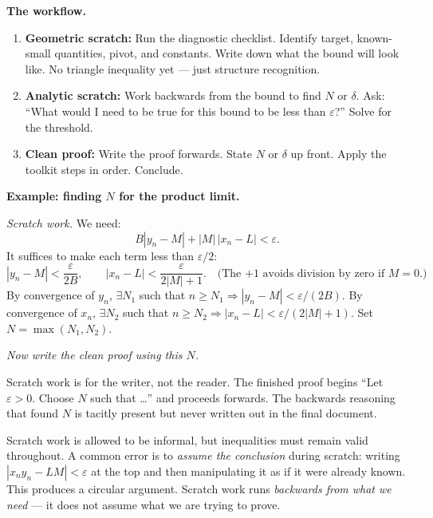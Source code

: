 \noindent\textbf{The workflow.}
\begin{enumerate}
  \item \textbf{Geometric scratch:} Run the diagnostic checklist.
        Identify target, known-small quantities, pivot, and constants.
        Write down what the bound will look like.
        No triangle inequality yet — just structure recognition.
  \item \textbf{Analytic scratch:} Work backwards from the bound
        to find $N$ or $\delta$.
        Ask: ``What would I need to be true for this bound to be
        less than $\varepsilon$?'' Solve for the threshold.
  \item \textbf{Clean proof:} Write the proof forwards.
        State $N$ or $\delta$ up front.
        Apply the toolkit steps in order.
        Conclude.
\end{enumerate}

\medskip

\noindent\textbf{Example: finding $N$ for the product limit.}

\textit{Scratch work.} We need:
\[
  B|y_n - M| + |M|\,|x_n - L| < \varepsilon.
\]
It suffices to make each term less than $\varepsilon/2$:
\[
  |y_n - M| < \frac{\varepsilon}{2B}, \qquad
  |x_n - L| < \frac{\varepsilon}{2|M|+1}.
  \quad\text{(The $+1$ avoids division by zero if $M=0$.)}
\]
By convergence of $y_n$, $\exists N_1$ such that $n \ge N_1
\Rightarrow |y_n - M| < \varepsilon/(2B)$.
By convergence of $x_n$, $\exists N_2$ such that $n \ge N_2
\Rightarrow |x_n - L| < \varepsilon/(2|M|+1)$.
Set $N = \max(N_1, N_2)$.

\textit{Now write the clean proof using this $N$.}

\begin{remark*}
Scratch work is for the writer, not the reader.
The finished proof begins ``Let $\varepsilon > 0$.
Choose $N$ such that \ldots'' and proceeds forwards.
The backwards reasoning that found $N$ is tacitly present
but never written out in the final document.
\end{remark*}

\begin{remark*}
Scratch work is allowed to be informal, but inequalities must
remain valid throughout.
A common error is to \emph{assume the conclusion} during scratch:
writing $|x_n y_n - LM| < \varepsilon$ at the top and then
manipulating it as if it were already known.
This produces a circular argument.
Scratch work runs \emph{backwards from what we need} — it does not
assume what we are trying to prove.
\end{remark*}

